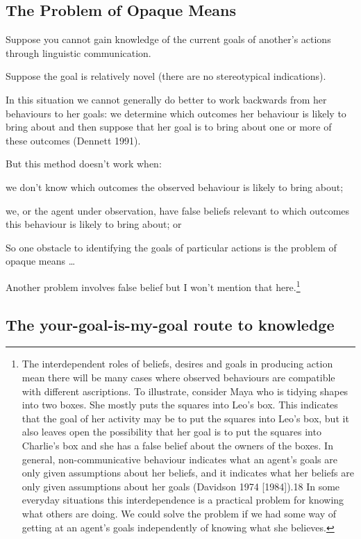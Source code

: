 \documentclass[12pt,a4paper]{extarticle}
\begin{document}
\subsection{The Problem of Opaque Means}

Suppose you cannot gain knowledge of the current goals of another's actions through linguistic communication.

Suppose the goal is relatively novel (there are no stereotypical indications).

In this situation we cannot generally do better to work backwards from her behaviours to her goals: we determine which outcomes her behaviour is likely to bring about and then suppose that her goal is to bring about one or more of these outcomes (Dennett 1991).  

But this method doesn’t work when: 
%
\begin{list}{*}{}
\item we don’t know which outcomes the observed behaviour is likely to bring about;
\item we, or the agent under observation, have false beliefs relevant to which outcomes this behaviour is likely to bring about; or
\end{list}
%
So one obstacle to identifying the goals of particular actions is the problem of opaque means …

Another problem involves false belief but I won't mention that here.\footnote{
 The interdependent roles of beliefs, desires and goals in producing action mean there will be many cases where observed behaviours are compatible with different ascriptions. To illustrate, consider Maya who is tidying shapes into two boxes. She mostly puts the squares into Leo’s box.
This indicates that the goal of her activity may be to put the squares into Leo’s box, but it also leaves open the possibility that her goal is to put the squares into Charlie’s box and she has a false belief about the owners of the boxes. In general, non-communicative behaviour indicates what an agent’s goals are only given assumptions about her beliefs, and it indicates what her beliefs are only given assumptions about her goals (Davidson 1974 [1984]).18	In some everyday situations this interdependence is a practical problem for knowing what others are doing. We could solve the problem if we had some way of getting at an agent’s goals independently of knowing what she believes.
 }

\subsection{The your-goal-is-my-goal route to knowledge}
\end{document}
